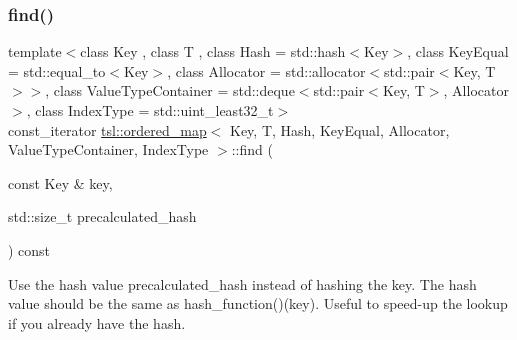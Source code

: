 \subsubsection{\texorpdfstring{find()}{find()}\hspace{0.1cm}{\footnotesize\ttfamily [2/6]}}
{\footnotesize\ttfamily template$<$class Key , class T , class Hash  = std\+::hash$<$\+Key$>$, class Key\+Equal  = std\+::equal\+\_\+to$<$\+Key$>$, class Allocator  = std\+::allocator$<$std\+::pair$<$\+Key, T$>$$>$, class Value\+Type\+Container  = std\+::deque$<$std\+::pair$<$\+Key, T$>$, Allocator$>$, class Index\+Type  = std\+::uint\+\_\+least32\+\_\+t$>$ \\
const\+\_\+iterator \mbox{\hyperlink{classtsl_1_1ordered__map}{tsl\+::ordered\+\_\+map}}$<$ Key, T, Hash, Key\+Equal, Allocator, Value\+Type\+Container, Index\+Type $>$\+::find (\begin{DoxyParamCaption}\item[{const Key \&}]{key,  }\item[{std\+::size\+\_\+t}]{precalculated\+\_\+hash }\end{DoxyParamCaption}) const\hspace{0.3cm}{\ttfamily [inline]}}





Use the hash value \textquotesingle{}precalculated\+\_\+hash\textquotesingle{} instead of hashing the key. The hash value should be the same as hash\+\_\+function()(key). Useful to speed-\/up the lookup if you already have the hash. \mbox{\label{classtsl_1_1ordered__map_a077b9b318cb7e846455f030602561b3f}} 
